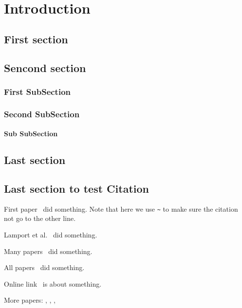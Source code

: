 \chapter{Introduction}
\lipsum[2]

\section{First section}
\lipsum[3]

\section{Sencond  section}
\lipsum[3]
\subsection{First SubSection}
\lipsum[3]
\subsection{Second SubSection}
\lipsum[3]
\subsubsection{Sub SubSection}
\lipsum[3]	 
	 
\section{Last section} 
\lipsum[3]
\section{Last section to test Citation} 

First paper~\cite{goossens1994latex} did something. Note that here we use \verb|~| to make sure the citation not go to the other line. 

Lamport et al.~\cite{lamport1994latex} did something.

Many papers~\cite{makuuchi2000progress,yassin1994latex} did something.


All papers~\cite{makuuchi2000progress,yassin1994latex,
	goossens1994latex,lamport1994latex} did something.

Online link~\cite{onlineWindows} is about something.

More papers: \cite{colu92}, \cite{goossens1994latex}, \cite{jame76}, \cite{colu92,phil99,gree00,smit54}
